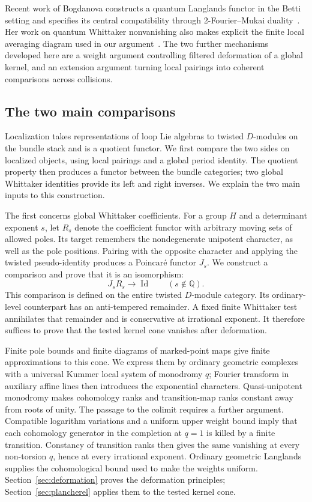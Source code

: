 Recent work of Bogdanova constructs a quantum Langlands functor in the
Betti setting and specifies its central compatibility through
2-Fourier--Mukai duality~\cite{BogdanovaBetti}. Her work on quantum
Whittaker nonvanishing also makes explicit the finite local averaging
diagram used in our argument~\cite{BogdanovaWhit}. The two further
mechanisms developed here are a
weight argument controlling filtered deformation of a global kernel,
and an extension argument turning local pairings into coherent
comparisons across collisions.

\subsection{The two main comparisons}

Localization takes representations of loop Lie algebras to twisted
$D$-modules on the bundle stack and is a quotient functor. We first
compare the two sides on localized objects, using local pairings and a
global period identity. The quotient property then produces a functor
between the bundle categories; two global Whittaker identities provide
its left and right inverses. We explain the two main inputs to this
construction.

The first concerns global Whittaker coefficients. For a group $H$ and a
determinant exponent $s$, let $R_s$ denote the coefficient functor with
arbitrary moving sets of allowed poles. Its target remembers the
nondegenerate unipotent character, as well as the pole positions. Pairing
with the opposite character and applying the twisted pseudo-identity
produces a Poincar\'e functor $J_s$. We construct a comparison and prove
that it is an isomorphism:
\begin{equation}\label{intro:plancherel}
                 J_sR_s\longrightarrow\operatorname{Id}
                 \qquad(s\notin\mathbb Q).
\end{equation}
This comparison is defined on the entire twisted $D$-module category.
Its ordinary-level counterpart has an anti-tempered remainder. A fixed
finite Whittaker test annihilates that remainder and is conservative at
irrational exponent. It therefore suffices to prove that the tested
kernel cone vanishes after deformation.

Finite pole bounds and finite diagrams of marked-point maps give finite
approximations to this cone. We express them by ordinary geometric
complexes with a universal Kummer local system of monodromy $q$;
Fourier transform in auxiliary affine lines then introduces the
exponential characters. Quasi-unipotent monodromy makes cohomology ranks
and transition-map ranks constant away from roots of unity. The passage
to the colimit requires a further argument. Compatible logarithm
variations and a uniform upper weight bound imply that each cohomology
generator in the completion at $q=1$ is killed by a finite transition.
Constancy of transition ranks then gives the same vanishing at every
non-torsion $q$, hence at every irrational exponent. Ordinary geometric
Langlands supplies the cohomological bound used to make the weights
uniform. Section~\ref{sec:deformation} proves the deformation principles;
Section~\ref{sec:plancherel} applies them to the tested kernel cone.

